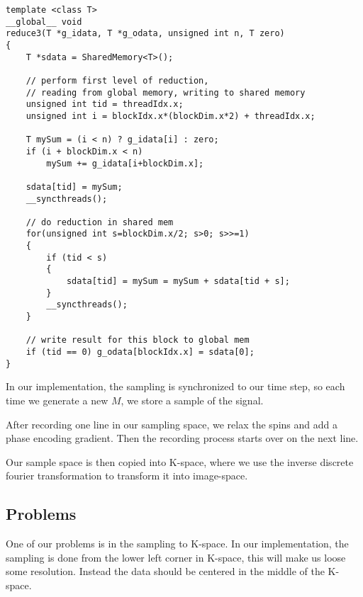 \begin{strip}
\begin{lstlisting}
template <class T>
__global__ void
reduce3(T *g_idata, T *g_odata, unsigned int n, T zero)
{
    T *sdata = SharedMemory<T>();

    // perform first level of reduction,
    // reading from global memory, writing to shared memory
    unsigned int tid = threadIdx.x;
    unsigned int i = blockIdx.x*(blockDim.x*2) + threadIdx.x;

    T mySum = (i < n) ? g_idata[i] : zero;
    if (i + blockDim.x < n) 
        mySum += g_idata[i+blockDim.x];  

    sdata[tid] = mySum;
    __syncthreads();

    // do reduction in shared mem
    for(unsigned int s=blockDim.x/2; s>0; s>>=1) 
    {
        if (tid < s) 
        {
            sdata[tid] = mySum = mySum + sdata[tid + s];
        }
        __syncthreads();
    }

    // write result for this block to global mem 
    if (tid == 0) g_odata[blockIdx.x] = sdata[0];
}
\end{lstlisting}  
\end{strip}

In our implementation, the sampling is synchronized to our time step,
so each time we generate a new $M$, we store a sample of the signal.

After recording one line in our sampling space, we relax the spins and
add a phase encoding gradient. Then the recording process starts over
on the next line.

Our sample space is then copied into K-space, where we use the
inverse discrete fourier transformation to transform it into image-space.

\subsection{Problems}

One of our problems is in the sampling to K-space. In our
implementation, the sampling is done from the lower left corner in
K-space, this will make us loose some resolution. Instead the data
should be centered in the middle of the K-space.



